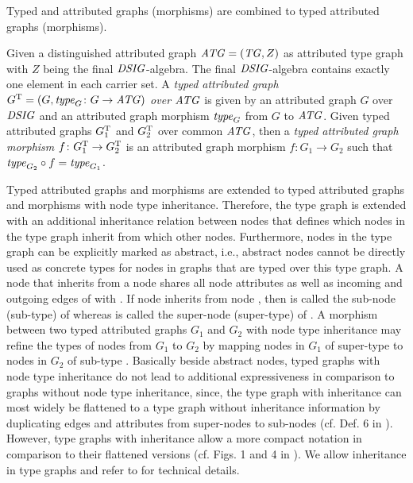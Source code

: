 Typed and attributed graphs (morphisms) are combined to typed attributed graphs (morphisms).

\begin{definition}
\label{def:sec-gt-graphs:typed_attr_graphs}
Given a distinguished attributed graph $\mathit{ATG}=(\mathit{TG},Z)$ as attributed type graph with $Z$ being the final $\mathit{DSIG}$-algebra.
The final $\mathit{DSIG}$-algebra contains exactly one element in each carrier set.
A \emph{typed attributed graph  $G^\mathrm{T}=(G,\mathit{type}_G\colon G \to \mathit{ATG})$ over $\mathit{ATG}$} is given by an attributed graph $G$ over $\mathit{DSIG}$ and an attributed graph morphism $\mathit{type}_G$ from $G$ to $\mathit{ATG}$.
Given typed attributed graphs $G^\mathrm{T}_1$ and $G^\mathrm{T}_2$ over common $\mathit{ATG}$, then a \emph{typed attributed graph morphism} $f\colon G^\mathrm{T}_1 \to G^\mathrm{T}_2$ is an attributed graph morphism $f\colon G_1 \to G_2$ such that $\mathit{type}_{G_2} \circ f=\mathit{type}_{G_1}$.
\envEndMarker
\end{definition}

\begin{remark}
\label{rem:sec-gt-graphs:inheritance}
Typed attributed graphs and morphisms are extended to typed attributed graphs and morphisms with node type inheritance.
Therefore, the type graph is extended with an additional inheritance relation between nodes that defines which nodes in the type graph inherit from which other nodes.
Furthermore, nodes in the type graph can be explicitly marked as abstract, i.e., abstract nodes cannot be directly used as concrete types for nodes in graphs that are typed over this type graph.
A node  that inherits from a node  shares all node attributes as well as incoming and outgoing edges of  with .
If node  inherits from node , then  is called the sub-node (sub-type) of  whereas  is called the super-node (super-type) of .
A morphism between two typed attributed graphs $G_1$ and $G_2$ with node type inheritance may refine the types of nodes from $G_1$ to $G_2$ by mapping nodes in $G_1$ of super-type  to nodes in $G_2$ of sub-type .
Basically beside abstract nodes, typed graphs with node type inheritance do not lead to additional expressiveness in comparison to graphs without node type inheritance, since, the type graph with inheritance can most widely be flattened to a type graph without inheritance information by duplicating edges and attributes from super-nodes to sub-nodes (cf. Def. 6 in \cite{DBLP:journals/tcs/GolasLEO12}). 
However, type graphs with inheritance allow a more compact notation in comparison to their flattened versions (cf. Figs. 1 and 4 in \cite{DBLP:journals/tcs/GolasLEO12}).
We allow inheritance in type graphs and refer to \cite{DBLP:journals/tcs/GolasLEO12} for technical details.
\envEndMarker
\end{remark}

